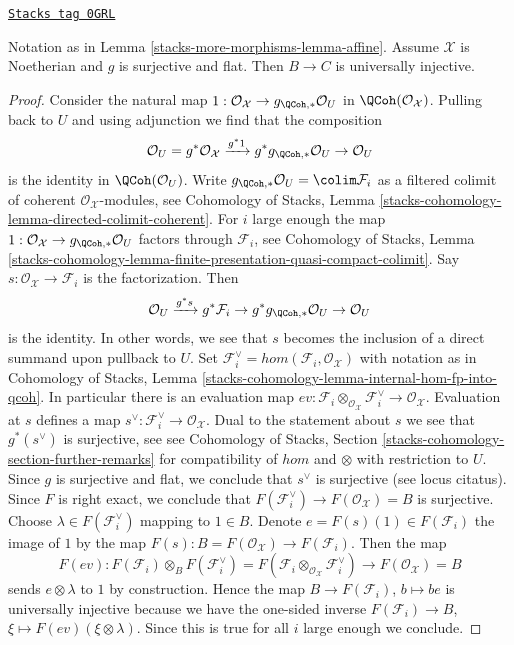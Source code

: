 \begin{lemma}
\label{stacks-more-morphisms-lemma-universally-injective}
\href{https://stacks.math.columbia.edu/tag/0GRL}{\texttt{Stacks tag 0GRL}}

Notation as in Lemma \ref{stacks-more-morphisms-lemma-affine}. Assume $\mathcal{X}$ is
Noetherian and $g$ is surjective and flat.
Then $B \to C$ is universally injective.
\end{lemma}

\begin{proof}
Consider the natural map
$1 : \mathcal{O}_\mathcal{X} \to g_{\QCoh, *}\mathcal{O}_U$
in $\QCoh(\mathcal{O}_\mathcal{X})$. Pulling back to $U$ and
using adjunction we find that the composition
$$
\mathcal{O}_U =
g^*\mathcal{O}_\mathcal{X} \xrightarrow{g^*1}
g^*g_{\QCoh, *}\mathcal{O}_U \to \mathcal{O}_U
$$
is the identity in $\QCoh(\mathcal{O}_U)$.
Write $g_{\QCoh, *}\mathcal{O}_U = \colim \mathcal{F}_i$
as a filtered colimit of coherent $\mathcal{O}_\mathcal{X}$-modules, see
Cohomology of Stacks, Lemma
\ref{stacks-cohomology-lemma-directed-colimit-coherent}.
For $i$ large enough the map
$1 : \mathcal{O}_\mathcal{X} \to g_{\QCoh, *}\mathcal{O}_U$
factors through $\mathcal{F}_i$, see
Cohomology of Stacks, Lemma
\ref{stacks-cohomology-lemma-finite-presentation-quasi-compact-colimit}.
Say $s : \mathcal{O}_\mathcal{X} \to \mathcal{F}_i$ is the
factorization. Then
$$
\mathcal{O}_U \xrightarrow{g^*s} g^*\mathcal{F}_i \to
g^*g_{\QCoh, *}\mathcal{O}_U \to \mathcal{O}_U
$$
is the identity. In other words, we see that $s$ becomes the
inclusion of a direct summand upon pullback to $U$. Set
$\mathcal{F}_i^\vee = hom(\mathcal{F}_i, \mathcal{O}_\mathcal{X})$
with notation as in
Cohomology of Stacks, Lemma
\ref{stacks-cohomology-lemma-internal-hom-fp-into-qcoh}.
In particular there is an evaluation map
$ev : \mathcal{F}_i \otimes_{\mathcal{O}_\mathcal{X}} \mathcal{F}_i^\vee
\to \mathcal{O}_\mathcal{X}$.
Evaluation at $s$ defines a map
$s^\vee : \mathcal{F}_i^\vee \to \mathcal{O}_\mathcal{X}$.
Dual to the statement about $s$ we see that $g^*(s^\vee)$ is surjective, see
see Cohomology of Stacks, Section
\ref{stacks-cohomology-section-further-remarks}
for compatibility of $hom$ and $\otimes$ with restriction to $U$.
Since $g$ is surjective and flat, we conclude that $s^\vee$ is surjective
(see locus citatus). Since $F$ is right exact, we conclude that
$F(\mathcal{F}_i^\vee) \to F(\mathcal{O}_\mathcal{X}) = B$ is surjective.
Choose $\lambda \in F(\mathcal{F}_i^\vee)$
mapping to $1 \in B$. Denote $e = F(s)(1) \in F(\mathcal{F}_i)$
the image of $1$ by the map
$F(s) : B = F(\mathcal{O}_\mathcal{X}) \to F(\mathcal{F}_i)$.
Then the map
$$
F(ev) :
F(\mathcal{F}_i) \otimes_B F(\mathcal{F}_i^\vee) =
F(\mathcal{F}_i \otimes_{\mathcal{O}_\mathcal{X}} \mathcal{F}_i^\vee)
\longrightarrow
F(\mathcal{O}_\mathcal{X}) = B
$$
sends $e \otimes \lambda$ to $1$ by construction. Hence the
map $B \to F(\mathcal{F}_i)$, $b \mapsto be$
is universally injective because we have the one-sided
inverse $F(\mathcal{F}_i) \to B$, $\xi \mapsto F(ev)(\xi \otimes \lambda)$.
Since this is true for all $i$ large enough we conclude.
\end{proof}

